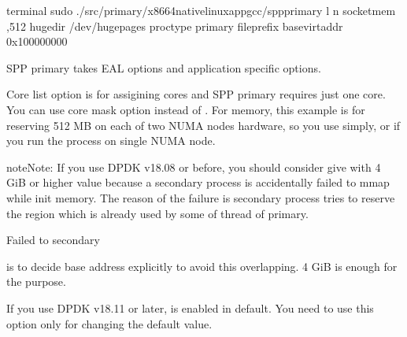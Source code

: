 \documentclass[a4paper,11pt,openany,oneside,english]{sphinxmanual}
\begin{document}
\begin{sphinxVerbatim}[commandchars=\\\{\},formatcom=\footnotesize]
 terminal 
 sudo ./src/primary/x86\PYGZus{}64\PYGZhy{}native\PYGZhy{}linuxapp\PYGZhy{}gcc/spp\PYGZus{}primary 
    \PYGZhy{}l  \PYGZhy{}n  
    \PYGZhy{}\PYGZhy{}socket\PYGZhy{}mem ,512 
    \PYGZhy{}\PYGZhy{}huge\PYGZhy{}dir /dev/hugepages 
    \PYGZhy{}\PYGZhy{}proc\PYGZhy{}type primary 
    \PYGZhy{}\PYGZhy{}file\PYGZhy{}prefix  
    \PYGZhy{}\PYGZhy{}base\PYGZhy{}virtaddr 0x100000000
\end{sphinxVerbatim}

SPP primary takes EAL options and application specific options.

Core list option  is for assigining cores and SPP primary requires just
one core. You can use core mask option  instead of .
For memory, this example is for reserving 512 MB on each of two NUMA nodes
hardware, so you use  simply, or 
if you run the process on single NUMA node.

\begin{sphinxadmonition}{note}{Note:}
If you use DPDK v18.08 or before,
you should consider give  with 4 GiB or higher value
because a secondary process is accidentally failed to mmap while init
memory. The reason of the failure is secondary process tries to reserve
the region which is already used by some of thread of primary.

\begin{sphinxVerbatim}[commandchars=\\\{\},formatcom=\footnotesize]
 Failed to secondary
\end{sphinxVerbatim}

 is to decide base address explicitly to avoid this
overlapping. 4 GiB  is enough for the purpose.

If you use DPDK v18.11 or later,  is enabled
in default. You need to use this option only for changing the default value.
\end{sphinxadmonition}
\end{document}
